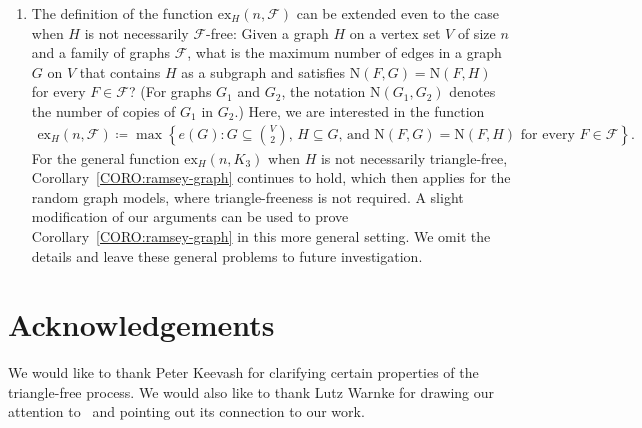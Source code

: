 \documentclass[11pt,a4paper]{article}
\newcommand{\graph}{H}
\begin{document}
\begin{enumerate}
For $m$ close to $\mathrm{sat}(n,K_3)$ (i.e. $n-1$), it appears that $S_{m}$ is the worst graph, that is, $\mathrm{ex}_{m}(n,K_3) = \mathrm{ex}_{S_m}(n,K_3) = m(n-m)$. However, for smaller values of $m$, the disjoint union of $5$-cycles is worse than $S_m$. 
We leave it as an open problem to determine the behavior of $\mathrm{ex}_{m}(n,\mathcal{F})$, in particular $\mathrm{ex}_{m}(n,K_3)$, as $m$ increases from $1$ to $\mathrm{sat}(n,\mathcal{F})$. 

\item The definition of the function $\mathrm{ex}_{\graph}(n,\mathcal{F})$ can be extended even to the case when $\graph$ is not necessarily $\mathcal{F}$-free: 
Given a graph $\graph$ on a vertex set $V$ of size $n$ and a family of graphs $\mathcal{F}$, what is the maximum number of edges in a graph $G$ on $V$ that contains $\graph$ as a subgraph and satisfies $\mathrm{N}(F,G) = \mathrm{N}(F,\graph)$ for every $F\in \mathcal{F}$? (For graphs $G_1$ and $G_2$, the notation $\mathrm{N}(G_1,G_2)$ denotes the number of copies of $G_1$ in $G_2$.) 
Here, we are interested in the function 
\begin{align*}
    \mathrm{ex}_{\graph}(n,\mathcal{F})
    \coloneqq \max\left\{e(G) \colon \text{$G \subseteq \binom{V}{2}$, $\graph \subseteq G$, and $\mathrm{N}(F,G) = \mathrm{N}(F,\graph)$ for every $F\in \mathcal{F}$}\right\}.
\end{align*}
For the general function $\mathrm{ex}_{\graph}(n,K_3)$ when $\graph$ is not necessarily triangle-free, Corollary~\ref{CORO:ramsey-graph} continues to hold, which then applies for the random graph models, where triangle-freeness is not required. A slight modification of our arguments can be used to prove Corollary~\ref{CORO:ramsey-graph} in this more general setting. We omit the details and leave these general problems to future investigation. 

\end{enumerate}

\section*{Acknowledgements}
%
We would like to thank Peter Keevash for clarifying certain properties of the triangle-free process. 
We would also like to thank Lutz Warnke for drawing our attention to~\cite{GL23} and pointing out its connection to our work.


\end{document}
